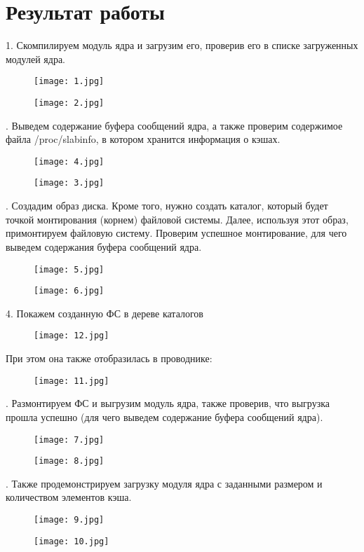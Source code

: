 \section*{Результат работы}
1. Скомпилируем модуль ядра и загрузим его, проверив его в списке загруженных модулей ядра.
\begin{figure}[h!]
	\center\texttt{[image: 1.jpg]}
\end{figure}
\begin{figure}[h!]
	\center\texttt{[image: 2.jpg]}
\end{figure}
. Выведем содержание буфера сообщений ядра, а также проверим содержимое файла /proc/slabinfo, в котором хранится информация о кэшах.
\begin{figure}[h!]
	\center\texttt{[image: 4.jpg]}
\end{figure}
\begin{figure}[h!]
	\center\texttt{[image: 3.jpg]}
\end{figure}
. Создадим образ диска. Кроме того, нужно создать каталог, который будет точкой монтирования (корнем) файловой системы. Далее, используя этот образ, примонтируем файловую систему. Проверим успешное монтирование, для чего выведем содержания буфера сообщений ядра.
\newpage 
\begin{figure}[h!]
	\center\texttt{[image: 5.jpg]}
\end{figure}
\begin{figure}[h!]
	\center\texttt{[image: 6.jpg]}
\end{figure}
4. Покажем созданную ФС в дереве каталогов
\begin{figure}[h!]
	\center\texttt{[image: 12.jpg]}
\end{figure}
\newline При этом она также отобразилась в проводнике:
\begin{figure}[h!]
	\center\texttt{[image: 11.jpg]}	
\end{figure}
. Размонтируем ФС и выгрузим модуль ядра, также проверив, что выгрузка прошла успешно (для чего выведем содержание буфера сообщений ядра).
\begin{figure}[h!]
	\center\texttt{[image: 7.jpg]}
\end{figure}
\begin{figure}[h!]
	\center\texttt{[image: 8.jpg]}
\end{figure}
. Также продемонстрируем загрузку модуля ядра с заданными размером и количеством элементов кэша.
\begin{figure}[h!]
	\center\texttt{[image: 9.jpg]}
\end{figure}
\begin{figure}[h!]
	\center\texttt{[image: 10.jpg]}
\end{figure}